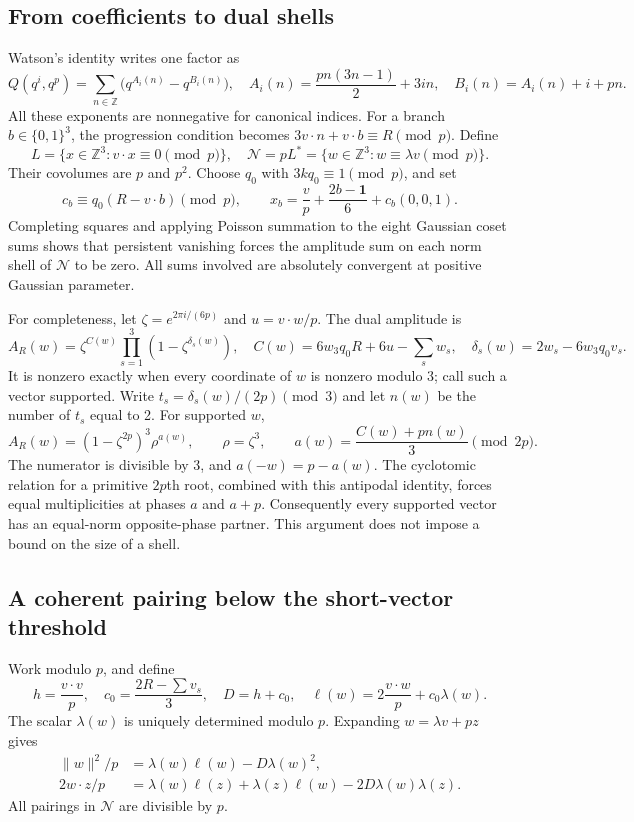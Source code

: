 \documentclass[11pt]{amsart}
\newcommand{\Z}{\mathbb Z}
\newcommand{\norm}[1]{\lVert#1\rVert}
\theoremstyle{definition}
\begin{document}
\subsection{From coefficients to dual shells}
Watson's identity writes one factor as
\[
 Q(q^i,q^p)=\sum_{n\in\Z}\bigl(q^{A_i(n)}-q^{B_i(n)}\bigr),\quad
 A_i(n)=\frac{pn(3n-1)}2+3in,\quad B_i(n)=A_i(n)+i+pn.
\]
All these exponents are nonnegative for canonical indices. For a branch
$b\in\{0,1\}^3$, the progression condition becomes
$3v\cdot n+v\cdot b\equiv R\pmod p$.
Define
\[
 L=\{x\in\Z^3:v\cdot x\equiv0\pmod p\},\quad
 \mathcal N=pL^*=\{w\in\Z^3:w\equiv\lambda v\pmod p\}.
\]
Their covolumes are $p$ and $p^2$. Choose $q_0$ with
$3kq_0\equiv1\pmod p$, and set
\[
 c_b\equiv q_0(R-v\cdot b)\pmod p,\qquad
 x_b=\frac vp+\frac{2b-\mathbf1}{6}+c_b(0,0,1).
\]
Completing squares and applying Poisson summation to the eight Gaussian
coset sums shows that persistent vanishing forces the amplitude sum on
each norm shell of $\mathcal N$ to be zero. All sums involved are
absolutely convergent at positive Gaussian parameter.

For completeness, let $\zeta=e^{2\pi i/(6p)}$ and $u=v\cdot w/p$.
The dual amplitude is
\[
 A_R(w)=\zeta^{C(w)}\prod_{s=1}^3(1-\zeta^{\delta_s(w)}),\quad
 C(w)=6w_3q_0R+6u-\sum_s w_s,\quad
 \delta_s(w)=2w_s-6w_3q_0v_s.
\]
It is nonzero exactly when every coordinate of $w$ is nonzero modulo 3;
call such a vector supported. Write $t_s=\delta_s(w)/(2p)\pmod3$ and
let $n(w)$ be the number of $t_s$ equal to 2. For supported $w$,
\[
 A_R(w)=(1-\zeta^{2p})^3\rho^{a(w)},\qquad
 \rho=\zeta^3,\qquad a(w)=\frac{C(w)+pn(w)}3\pmod{2p}.
\]
The numerator is divisible by 3, and $a(-w)=p-a(w)$.
The cyclotomic relation for a primitive $2p$th root, combined with this
antipodal identity, forces equal multiplicities at phases $a$ and $a+p$.
Consequently every supported vector has an equal-norm opposite-phase
partner. This argument does not impose a bound on the size of a shell.

\subsection{A coherent pairing below the short-vector threshold}
Work modulo $p$, and define
\[
 h=\frac{v\cdot v}{p},\quad c_0=\frac{2R-\sum v_s}{3},\quad
 D=h+c_0,\quad
 \ell(w)=2\frac{v\cdot w}{p}+c_0\lambda(w).
\]
The scalar $\lambda(w)$ is uniquely determined modulo $p$.
Expanding $w=\lambda v+pz$ gives
\begin{align}
 \norm{w}^2/p&=\lambda(w)\ell(w)-D\lambda(w)^2,\label{eq:norm}\\
 2w\cdot z/p&=\lambda(w)\ell(z)+\lambda(z)\ell(w)
                   -2D\lambda(w)\lambda(z).\label{eq:pairing}
\end{align}
All pairings in $\mathcal N$ are divisible by $p$.
\end{document}

